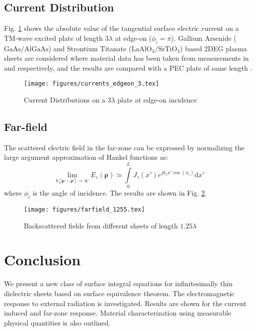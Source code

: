 \documentclass[conference, 10pt]{IEEEtran}
\renewcommand{\v}[1]{\mathbf{#1}} %
\newcommand{\p}{\rho}  %
\renewcommand{\inf}{\infty}  %
\renewcommand{\^}{\hat}  %
\begin{document}
\subsection{Current Distribution}
%
Fig. \ref{fig:edgeon} shows the absolute value of the tangential surface electric current on a TM-wave excited plate of length $3 \lambda$ at edge-on ($\phi_i = \pi$). Gallium Arsenide ($\mathrm{GaAs}/\mathrm{AlGaAs}$) and Strontium Titanate ($\mathrm{LaAlO_3}/\mathrm{SrTiO_3}$) based 2DEG plasma sheets are considered where material data has been taken from measurements in \cite{burke2000high} and \cite{herranz2012high} respectively, and the results are compared with a PEC plate of same length \cite{senior1979backscattering}.

%
\begin{figure}[h]
  \begin{center}
    \noindent
    \texttt{[image: figures/currents\_edgeon\_3.tex]}
    \caption{Current Distributions on a $3\lambda$ plate at edge-on incidence}
    \label{fig:edgeon}
  \end{center}
\end{figure}
%
\subsection{Far-field}
%
The scattered electric field in the far-zone can be expressed by normalizing the large argument approximation of Hankel functions as:
%
\begin{equation}
  \lim_{k_1|\v \p - \v \p'|\to\inf} E_z(\v \p) \simeq \int \limits_{0}^{L} J_z(x') e^{j k_1 x' \cos(\phi_i)} \mathrm{d}x'
  \label{eq:far-field}
\end{equation}
%
where $\phi_i$ is the angle of incidence. The results are shown in Fig. \ref{fig:rcs}.
%
\begin{figure}[h]
  \begin{center}
    \noindent
    \texttt{[image: figures/farfield\_1255.tex]}
    \caption{Backscattered fields from different sheets of length $1.25\lambda$}
    \label{fig:rcs}
  \end{center}
\end{figure}
\section{Conclusion}
%
We present a new class of surface integral equations for infinitesimally thin dielectric sheets based on surface equivalence theorem. The electromagnetic response to external radiation is investigated. Results are shown for the current induced and far-zone response. Material characterization using measurable physical quantities is also outlined.
%


\end{document}
